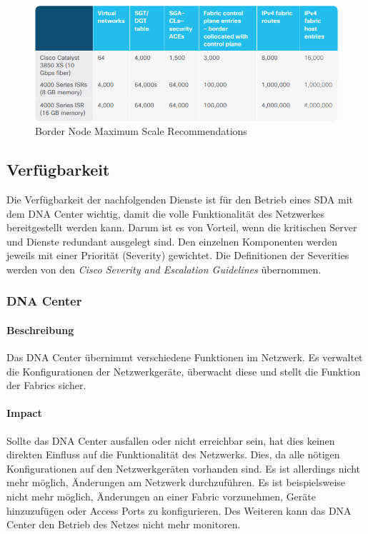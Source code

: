\begin{figure}[H]
	\centering
	\includegraphics[width=0.8\linewidth]{img/Analyse/CVD-MaxScale-BorderNode-1-2-5}
	\caption{Border Node Maximum Scale Recommendations \cite{sda-designguide-sept2018} }
	\label{fig:Border Node Maximum Scale RecommendationsA}
\end{figure}



\subsection{Verfügbarkeit}
Die Verfügbarkeit der nachfolgenden Dienste ist für den Betrieb eines SDA mit dem DNA Center wichtig, damit die volle Funktionalität des Netzwerkes bereitgestellt werden kann. Darum ist es von Vorteil, wenn die kritischen Server und Dienste redundant ausgelegt sind. Den einzelnen Komponenten werden jeweils mit einer Priorität (Severity) gewichtet. Die Definitionen der Severities werden von den \textit{Cisco Severity and Escalation Guidelines} übernommen. \cite{cisco-severity-guidelines}

\subsubsection{DNA Center}

\paragraph{Beschreibung}

Das DNA Center übernimmt verschiedene Funktionen im Netzwerk. Es verwaltet die Konfigurationen der Netzwerkgeräte, überwacht diese und stellt die Funktion der Fabrics sicher. 

\paragraph{Impact}

Sollte das DNA Center ausfallen oder nicht erreichbar sein, hat dies keinen direkten Einfluss auf die Funktionalität des Netzwerks. Dies, da alle nötigen Konfigurationen auf den Netzwerkgeräten vorhanden sind. Es ist allerdings nicht mehr möglich, Änderungen am Netzwerk durchzuführen. Es ist beispielsweise nicht mehr möglich, Änderungen an einer Fabric vorzunehmen, Geräte hinzuzufügen oder Access Ports zu konfigurieren. Des Weiteren kann das DNA Center den Betrieb des Netzes nicht mehr monitoren.

